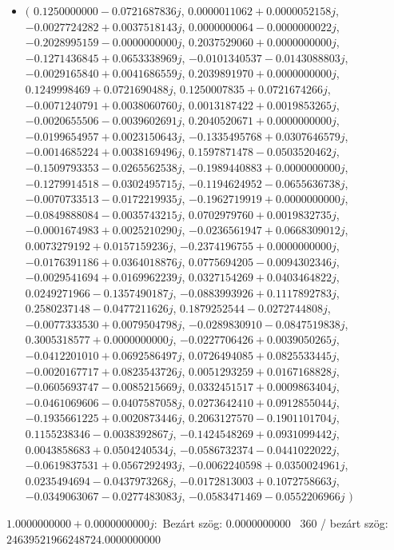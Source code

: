 \documentclass[14pt,a4paper]{article}
\begin{document}
\begin{itemize}
\item
$\big($
$0.1250000000-0.0721687836j$, $0.0000011062+0.0000052158j$, $-0.0027724282+0.0037518143j$, $0.0000000064-0.0000000022j$, $-0.2028995159-0.0000000000j$, $0.2037529060+0.0000000000j$, $-0.1271436845+0.0653338969j$, $-0.0101340537-0.0143088803j$, $-0.0029165840+0.0041686559j$, $0.2039891970+0.0000000000j$, $0.1249998469+0.0721690488j$, $0.1250007835+0.0721674266j$, $-0.0071240791+0.0038060760j$, $0.0013187422+0.0019853265j$, $-0.0020655506-0.0039602691j$, $0.2040520671+0.0000000000j$, $-0.0199654957+0.0023150643j$, $-0.1335495768+0.0307646579j$, $-0.0014685224+0.0038169496j$, $0.1597871478-0.0503520462j$, $-0.1509793353-0.0265562538j$, $-0.1989440883+0.0000000000j$, $-0.1279914518-0.0302495715j$, $-0.1194624952-0.0655636738j$, $-0.0070733513-0.0172219935j$, $-0.1962719919+0.0000000000j$, $-0.0849888084-0.0035743215j$, $0.0702979760+0.0019832735j$, $-0.0001674983+0.0025210290j$, $-0.0236561947+0.0668309012j$, $0.0073279192+0.0157159236j$, $-0.2374196755+0.0000000000j$, $-0.0176391186+0.0364018876j$, $0.0775694205-0.0094302346j$, $-0.0029541694+0.0169962239j$, $0.0327154269+0.0403464822j$, $0.0249271966-0.1357490187j$, $-0.0883993926+0.1117892783j$, $0.2580237148-0.0477211626j$, $0.1879252544-0.0272744808j$, $-0.0077333530+0.0079504798j$, $-0.0289830910-0.0847519838j$, $0.3005318577+0.0000000000j$, $-0.0227706426+0.0039050265j$, $-0.0412201010+0.0692586497j$, $0.0726494085+0.0825533445j$, $-0.0020167717+0.0823543726j$, $0.0051293259+0.0167168828j$, $-0.0605693747-0.0085215669j$, $0.0332451517+0.0009863404j$, $-0.0461069606-0.0407587058j$, $0.0273642410+0.0912855044j$, $-0.1935661225+0.0020873446j$, $0.2063127570-0.1901101704j$, $0.1155238346-0.0038392867j$, $-0.1424548269+0.0931099442j$, $0.0043858683+0.0504240534j$, $-0.0586732374-0.0441022022j$, $-0.0619837531+0.0567292493j$, $-0.0062240598+0.0350024961j$, $0.0235494694-0.0437973268j$, $-0.0172813003+0.1072758663j$, $-0.0349063067-0.0277483083j$, $-0.0583471469-0.0552206966j$
$\big)$
\end{itemize}
$1.0000000000+0.0000000000j$:\
Bezárt szög: $0.0000000000$ \
360 / bezárt szög: $24639521966248724.0000000000$\
\end{document}

